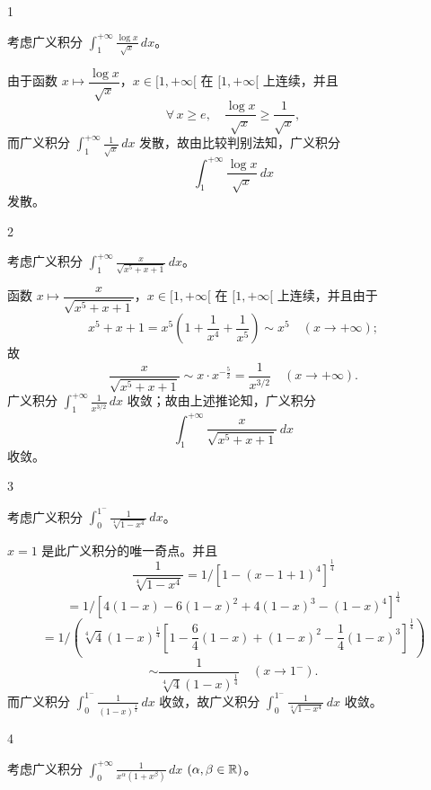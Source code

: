 \begin{sourceexample}{1}

考虑广义积分 $\displaystyle\int_1^{+\infty}\frac{\log x}{\sqrt{x}}\,dx$。

\end{sourceexample}

由于函数 $x\longmapsto\dfrac{\log x}{\sqrt{x}}$，$x\in[1,+\infty[$ 在 $[1,+\infty[$ 上连续，并且
\[\forall\,x\geqslant e,\quad\frac{\log x}{\sqrt{x}}\geqslant\frac{1}{\sqrt{x}},\]
而广义积分 $\displaystyle\int_1^{+\infty}\frac{1}{\sqrt{x}}\,dx$ 发散，故由比较判别法知，广义积分
\[\int_1^{+\infty}\frac{\log x}{\sqrt{x}}\,dx\]
发散。

\begin{sourceexample}{2}

考虑广义积分 $\displaystyle\int_1^{+\infty}\frac{x}{\sqrt{x^5+x+1}}\,dx$。

\end{sourceexample}

函数 $x\longmapsto\dfrac{x}{\sqrt{x^5+x+1}}$，$x\in[1,+\infty[$ 在 $[1,+\infty[$ 上连续，并且由于
\[x^5+x+1=x^5\left(1+\frac{1}{x^4}+\frac{1}{x^5}\right)\sim x^5\quad(x\to+\infty);\]
故
\[\frac{x}{\sqrt{x^5+x+1}}\sim x\cdot x^{-\frac{5}{2}}=\frac{1}{x^{3/2}}\quad(x\to+\infty).\]
广义积分 $\displaystyle\int_1^{+\infty}\frac{1}{x^{3/2}}\,dx$ 收敛；故由上述推论知，广义积分
\[\int_1^{+\infty}\frac{x}{\sqrt{x^5+x+1}}\,dx\]
收敛。

\begin{sourceexample}{3}

考虑广义积分 $\displaystyle\int_0^{1^-}\frac{1}{\sqrt[4]{1-x^4}}\,dx$。

\end{sourceexample}

$x=1$ 是此广义积分的唯一奇点。并且
\[\frac{1}{\sqrt[4]{1-x^4}}=1/[1-(x-1+1)^4]^{\frac{1}{4}}\]
\[=1/[4(1-x)-6(1-x)^2+4(1-x)^3-(1-x)^4]^{\frac{1}{4}}\]
\[=1/\left(\sqrt[4]{4}(1-x)^{\frac{1}{4}}\left[1-\frac{6}{4}(1-x)+(1-x)^2-\frac{1}{4}(1-x)^3\right]^{\frac{1}{4}}\right)\]
\[\sim\frac{1}{\sqrt[4]{4}(1-x)^{\frac{1}{4}}}\quad(x\to1^-).\]
而广义积分 $\displaystyle\int_0^{1^-}\frac{1}{(1-x)^{\frac{1}{4}}}\,dx$ 收敛，故广义积分 $\displaystyle\int_0^{1^-}\frac{1}{\sqrt[4]{1-x^4}}\,dx$ 收敛。

\begin{sourceexample}{4}

考虑广义积分 $\displaystyle\int_0^{+\infty}\frac{1}{x^{\alpha}(1+x^{\beta})}\,dx$ $(\alpha,\beta\in\mathbb{R})$。

\end{sourceexample}

